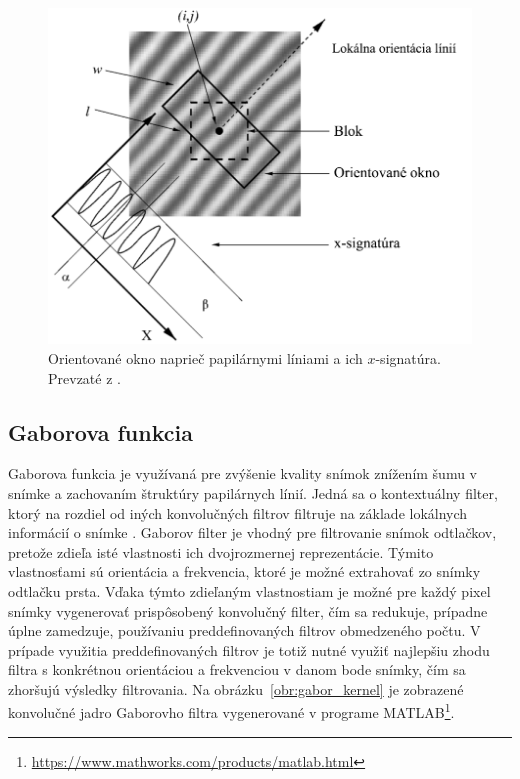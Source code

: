   \begin{figure}[h]
    \centering
    \includegraphics[width=0.7\linewidth]{obrazky-figures/frekvencia-Hong.png}
    \caption{Orientované okno naprieč papilárnymi líniami a ich $x$-signatúra. Prevzaté z \cite{Hong}.}
    \label{obr:frekvencia-Hong}
  \end{figure}

  \subsection{Gaborova funkcia} \label{sec:gaborova_funkcia}
  Gaborova funkcia je využívaná pre zvýšenie kvality snímok znížením šumu v snímke a zachovaním štruktúry papilárnych línií. Jedná sa o kontextuálny
  filter, ktorý na rozdiel od iných konvolučných filtrov filtruje na základe lokálnych informácií o snímke \cite{Handbook}. Gaborov filter je vhodný
  pre filtrovanie snímok odtlačkov, pretože zdieľa isté vlastnosti ich dvojrozmernej reprezentácie. Týmito vlastnosťami sú orientácia a frekvencia,
  ktoré je možné extrahovať zo snímky odtlačku prsta. Vďaka týmto zdieľaným vlastnostiam je možné pre každý pixel snímky vygenerovať prispôsobený konvolučný
  filter, čím sa redukuje, prípadne úplne zamedzuje, používaniu preddefinovaných filtrov obmedzeného počtu. V prípade využitia preddefinovaných filtrov je totiž
  nutné využiť najlepšiu zhodu filtra s konkrétnou orientáciou a frekvenciou v danom bode snímky, čím sa zhoršujú výsledky filtrovania.
  Na obrázku~{\ref{obr:gabor_kernel}} je zobrazené konvolučné jadro Gaborovho filtra vygenerované v programe
  \mbox{MATLAB}\footnote{\url{https://www.mathworks.com/products/matlab.html}}.
  
